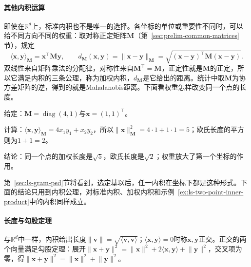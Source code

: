 \paragraph{其他内积运算}
\label{sec:ls-weighted-inner-products}
即使在$\mathbb R^d$上，标准内积也不是唯一的选择。各坐标的单位或重要性不同时，可以给不同方向不同的权重：取对称正定矩阵$\bm M$（第~\ref{sec:prelim-common-matrices}节），规定
\begin{equation}
 \langle\bm x,\bm y\rangle_{\bm M}=\bm x^\top\bm M\bm y,
 \qquad
 d_{\bm M}(\bm x,\bm y)=\lVert\bm x-\bm y\rVert_{\bm M}=\sqrt{(\bm x-\bm y)^\top\bm M(\bm x-\bm y)}.
 \label{eq:linear-algebra-mahalanobis-pseudodistance}
\end{equation}
双线性来自矩阵乘法的分配律，对称性来自$\bm M^\top=\bm M$，正定性就是$\bm M$的正定，所以它满足内积的三条公理，称为加权内积，$d_{\bm M}$是它给出的距离。统计中取$\bm M$为协方差矩阵的逆，得到的就是Mahalanobis距离。下面看权重怎样改变同一个点的长度。
\begin{example}[加权内积下的长度]
\label{ex:ls-weighted-length}
给定：$\bm M=\operatorname{diag}(4,1)$与$\bm x=(1,1)^\top$。

计算：$\langle\bm x,\bm y\rangle_{\bm M}=4x_1y_1+x_2y_2$，所以$\lVert\bm x\rVert_{\bm M}^2=4\cdot1+1\cdot1=5$；欧氏长度的平方则为$1+1=2$。

结论：同一个点的加权长度是$\sqrt5$，欧氏长度是$\sqrt2$；权重放大了第一个坐标的作用。
\end{example}
第~\ref{sec:ls-gram-psd}节将看到，选定基以后，任一内积在坐标下都是这种形式。下面的结论只用到内积公理，对标准内积、加权内积和示例~\ref{ex:ls-two-point-inner-product}中的内积同样成立。

\paragraph{长度与勾股定理}
与$\mathbb R^d$中一样，内积给出长度$\lVert\bm v\rVert=\sqrt{\langle\bm v,\bm v\rangle}$；$\langle\bm x,\bm y\rangle=0$时称$\bm x,\bm y$正交。正交的两个向量满足勾股定理：展开$\lVert\bm x+\bm y\rVert^2=\lVert\bm x\rVert^2+2\langle\bm x,\bm y\rangle+\lVert\bm y\rVert^2$，交叉项为零，得$\lVert\bm x+\bm y\rVert^2=\lVert\bm x\rVert^2+\lVert\bm y\rVert^2$。

